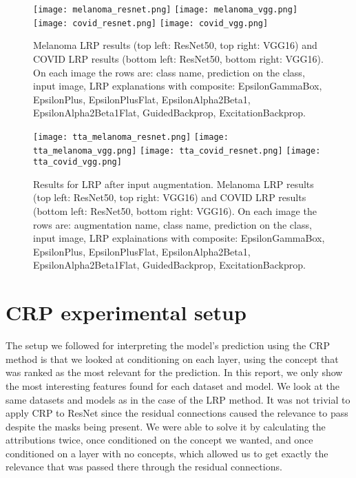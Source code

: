 \documentclass[twoside,11pt]{article}
\begin{document}
\begin{figure}[t]
    \centering
    \texttt{[image: melanoma\_resnet.png]}
    \texttt{[image: melanoma\_vgg.png]}
    \texttt{[image: covid\_resnet.png]}
    \texttt{[image: covid\_vgg.png]}
    \caption{
    Melanoma LRP results (top left: ResNet50, top right: VGG16) and COVID LRP results (bottom left: ResNet50, bottom right: VGG16).
    On each image the rows are: class name, prediction on the class, input image, LRP explanations with composite: EpsilonGammaBox, EpsilonPlus, EpsilonPlusFlat, EpsilonAlpha2Beta1, EpsilonAlpha2Beta1Flat, GuidedBackprop, ExcitationBackprop.
    }
    \label{fig:lrp_long}
\end{figure}
\begin{figure}[t]
    \centering
    \texttt{[image: tta\_melanoma\_resnet.png]}
    \texttt{[image: tta\_melanoma\_vgg.png]}
    \texttt{[image: tta\_covid\_resnet.png]}
    \texttt{[image: tta\_covid\_vgg.png]}
    \caption{
    Results for LRP after input augmentation.
    Melanoma LRP results (top left: ResNet50, top right: VGG16) and COVID LRP results (bottom left: ResNet50, bottom right: VGG16).
    On each image the rows are: augmentation name, class name, prediction on the class, input image, LRP explainations with composite: EpsilonGammaBox, EpsilonPlus, EpsilonPlusFlat, EpsilonAlpha2Beta1, EpsilonAlpha2Beta1Flat, GuidedBackprop, ExcitationBackprop.
    }
    \label{fig:lrp_tta_long}
\end{figure}

\section{CRP experimental setup} \label{appendix:crp_setup}
The setup we followed for interpreting the model's prediction using the CRP method is that we looked at conditioning on each layer, using the concept that was ranked as the most relevant for the prediction. In this report, we only show the most interesting features found for each dataset and model. We look at the same datasets and models as in the case of the LRP method. It was not trivial to apply CRP to ResNet since the residual connections caused the relevance to pass despite the masks being present. We were able to solve it by calculating the attributions twice, once conditioned on the concept we wanted, and once conditioned on a layer with no concepts, which allowed us to get exactly the relevance that was passed there through the residual connections.
\end{document}
